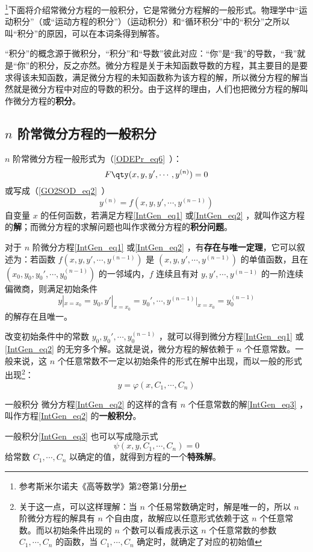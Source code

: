 \footnote{参考斯米尔诺夫《高等数学》第2卷第1分册}下面将介绍常微分方程的一般积分，它是常微分方程解的一般形式。物理学中“运动积分”（或“运动方程的积分”）（运动积分）和“循环积分”中的“积分”之所以叫“积分”的原因，可以在本词条得到解答。

“积分”的概念源于微积分，“积分”和“导数”彼此对应：“你”是“我”的导数，“我”就是“你”的积分，反之亦然。微分方程是关于未知函数导数的方程，其主要目的是要求得该未知函数，满足微分方程的未知函数称为该方程的解，所以微分方程的解当然就是微分方程中对应的导数的积分。由于这样的理由，人们也把微分方程的解叫作微分方程的\textbf{积分}。
\subsection{$n$ 阶常微分方程的一般积分}
$n$ 阶常微分方程一般形式为（\autoref{ODEPr_eq6}~）：
\begin{equation}\label{IntGen_eq1}
F \qty(x,y,y',\cdots,y^{(n)}) =0
\end{equation}
或写成（\autoref{GO2SOD_eq2}~）
\begin{equation}\label{IntGen_eq2}
y^{(n)}=f(x,y,y',\cdots,y^{(n-1)})
\end{equation}
自变量 $x$ 的任何函数，若满足方程\autoref{IntGen_eq1} 或\autoref{IntGen_eq2} ，就叫作这方程的\textbf{解}；而微分方程的求解问题也叫作求微分方程的\textbf{积分问题}。

对于 $n$ 阶微分方程\autoref{IntGen_eq1} 或\autoref{IntGen_eq2} ，有\textbf{存在与唯一定理}，它可以叙述为：若函数 $f(x,y,y',\cdots,y^{(n-1)})$ 是 $(x,y,y',\cdots,y^{(n-1)})$ 的单值函数，且在 $(x_0,y_0,y_0',\cdots,y_0^{(n-1)})$ 的一邻域内，$f$ 连续且有对 $y,y',\cdots,y^{(n-1)}$ 的一阶连续偏微商，则满足初始条件
\begin{equation}\label{IntGen_eq5}
y|_{x=x_0}=y_0,y'|_{x=x_0}=y_0',\cdots,y^{(n-1)}|_{x=x_0}=y_0^{(n-1)}
\end{equation}
的解存在且唯一。

改变初始条件中的常数 $y_0,y_0',\cdots,y_0^{(n-1)}$ ，就可以得到微分方程\autoref{IntGen_eq1} 或\autoref{IntGen_eq2} 的无穷多个解。这就是说，微分方程的解依赖于 $n$ 个任意常数。一般来说，这 $n$ 个任意常数不一定以初始条件的形式在解中出现，而以一般的形式出现\footnote{关于这一点，可以这样理解：当 $n$ 个任易常数确定时，解是唯一的，所以 $n$ 阶微分方程的解具有 $n$ 个自由度，故解应以任意形式依赖于这 $n$ 个任意常数。而以初始条件出现的 $n$ 个数可以看成表示这 $n$ 个任意常数的参数 $C_1,\cdots,C_n$ 的函数，当 $C_1,\cdots,C_n$ 确定时，就确定了对应的初始值}：
\begin{equation}\label{IntGen_eq3}
y=\varphi(x,C_1,\cdots,C_n)
\end{equation}
\begin{definition}{一般积分}
微分方程\autoref{IntGen_eq2} 的这样的含有 $n$ 个任意常数的解\autoref{IntGen_eq3} ，叫作方程\autoref{IntGen_eq2} 的\textbf{一般积分}。
\end{definition}
一般积分\autoref{IntGen_eq3} 也可以写成隐示式
\begin{equation}\label{IntGen_eq4}
\psi(x,y,C_1,\cdots,C_n)=0
\end{equation}
给常数 $C_1,\cdots,C_n$ 以确定的值，就得到方程的一个\textbf{特殊解}。

